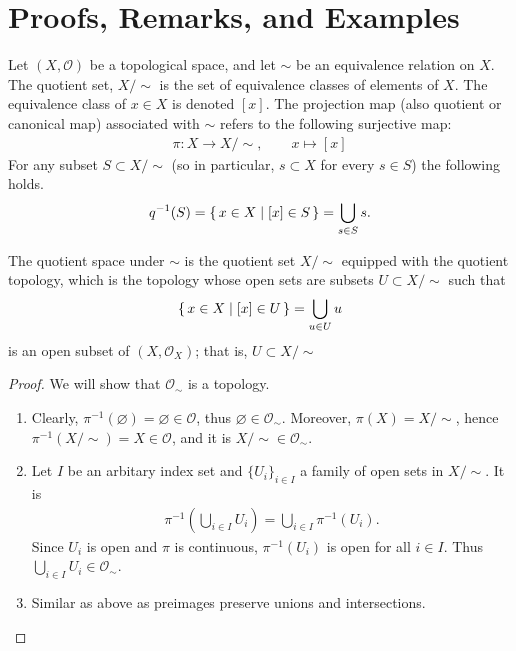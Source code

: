 \section{Proofs, Remarks, and Examples}
\begin{defbox}
    \begin{definition}
        Let \((X, \mathcal{O})\) be a {\color{mathif}topological space}, and let \(\sim\) be an {\color{mathif}equivalence relation} on \(X\). The {\color{maththen}quotient set}, \(X / \sim\) is the {\color{mathobj}set} of {\color{mathobj}equivalence classes} of elements of \(X\). The equivalence class of \(x \in X\) is {\color{mathrem}denoted} \([x]\). The {\color{maththen}projection map} (also {\color{mathrem}quotient} or {\color{mathrem}canonical map}) associated with \(\sim\) refers to the following {\color{mathif}surjective map}:
        \begin{align*}
            \pi: X \longrightarrow X / \sim, \qquad x \mapsto [x]
        \end{align*}
        For any subset \(S \subset X / \sim\) (so in particular, \(s \subset X\) for every \(s \in S\)) the following holds.
        \begin{align*}
            q^{-1}(S) = \left\{\, x \in X \mid [x] \in S \,\right\} = \bigcup_{s \in S} s \text{.}
        \end{align*}

        The quotient space under \(\sim\) is the quotient set \(X / \sim\) equipped with the quotient topology, which is the topology whose open sets are subsets \(U \subset X / \sim\) such that 
        \begin{align*}
            \left\{\, x \in X \mid [x] \in U \,\right\} = \bigcup_{u \in U}u
        \end{align*}
        is an open subset of \((X, \mathcal{O}_X)\); that is, \(U \subset X / \sim\)
    \end{definition}
\end{defbox}
%
\begin{proof}
    We will show that \(\mathcal{O}_\sim\) is a topology.
    \begin{enumerate}
        \item Clearly, \(\pi^{-1}(\varnothing) = \varnothing \in \mathcal{O}\), thus \(\varnothing \in \mathcal{O}_\sim\). Moreover, \(\pi(X) = X / \sim\), hence \(\pi^{-1}(X / \sim) = X \in \mathcal{O}\), and it is \(X / \sim \in \mathcal{O}_\sim\).
        \item Let \(I\) be an arbitary index set and \(\{U_i\}_{i \in I}\) a family of open sets in \(X / \sim\). It is
        \begin{align}
            \pi^{-1}\left( \bigcup_{i \in I} U_i \right) = \bigcup_{i \in I} \pi^{-1}(U_i) \text{.}
        \end{align}
        Since \(U_i\) is open and \(\pi\) is continuous, \(\pi^{-1}(U_i)\) is open for all \(i \in I\). Thus \(\bigcup_{i \in I} U_i \in \mathcal{O}_\sim\).
        \item Similar as above as preimages preserve unions and intersections.
    \end{enumerate}
\end{proof}
